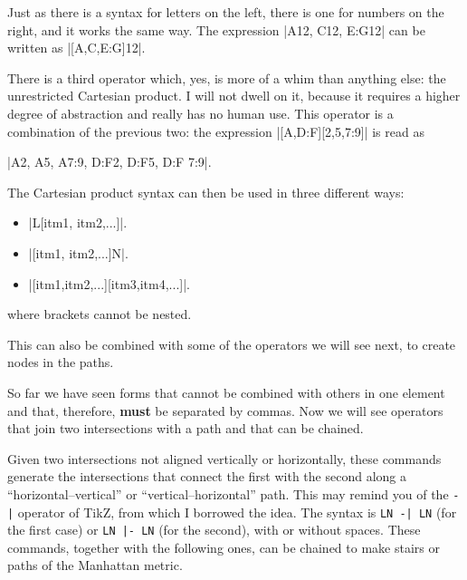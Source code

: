 	Just as there is a syntax for letters on the left, there is one for numbers on the right, and it works the same way. The expression |A12, C12, E:G12| can be written as |[A,C,E:G]12|.

	There is a third operator which, yes, is more of a whim than anything else: the unrestricted Cartesian product. I will not dwell on it, because it requires a higher degree of abstraction and really has no human use. This operator is a combination of the previous two: the expression |[A,D:F][2,5,7:9]| is read as
	\begin{center}
		|A2, A5, A7:9, D:F2, D:F5, D:F 7:9|.
	\end{center}

	\begin{codeexample}[width=4cm]
		\begin{goban}
			\stones[b]{[A, D:F][2, 5, 7:9]}
		\end{goban}
	\end{codeexample}

	The Cartesian product syntax can then be used in three different ways:
\begin{itemize}
	\item |L[itm1, itm2,...]|.
	\item |[itm1, itm2,...]N|.
	\item |[itm1,itm2,...][itm3,itm4,...]|.
\end{itemize}
where brackets cannot be nested.

This can also be combined with some of the operators we will see next, to create nodes in the paths.

So far we have seen forms that cannot be combined with others in one element and that, therefore, \textbf{must} be separated by commas. Now we will see operators that join two intersections with a path and that can be chained.


Given two intersections not aligned vertically or horizontally, these commands generate the intersections that connect the first with the second along a ``horizontal--vertical'' or ``vertical--horizontal'' path. This may remind you of the \verb+-|+ operator of TikZ, from which I borrowed the idea. The syntax is \verb+LN -| LN+ (for the first case) or \verb+LN |- LN+ (for the second), with or without spaces. These commands, together with the following ones, can be chained to make stairs or paths of the Manhattan metric.

